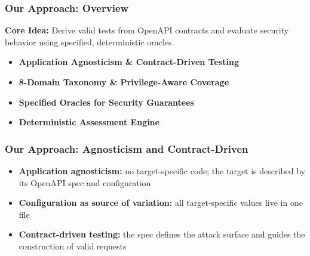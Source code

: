 \begin{frame}
    \frametitle{Our Approach: Overview}

    \textbf{Core Idea:} Derive \alert{valid tests} from OpenAPI contracts and evaluate \alert{security behavior} using specified, deterministic oracles.

    \vspace{1em}
    \begin{itemize}
        \setlength{\itemsep}{0.8em}
        \item \textbf{Application \alert{Agnosticism} \& \alert{Contract-Driven} Testing}

        \item \textbf{8-Domain \alert{Taxonomy} \& Privilege-Aware Coverage}

        \item \textbf{\alert{Specified Oracles} for Security Guarantees}

        \item \textbf{\alert{Deterministic} Assessment Engine}
    \end{itemize}

\end{frame}


\begin{frame}
    \frametitle{Our Approach: Agnosticism and Contract-Driven}
    \begin{itemize}
        \setlength{\itemsep}{0.8em}
        \item \textbf{Application agnosticism:} no target-specific code; the target is described by its \alert{OpenAPI spec} and configuration

        \item \textbf{Configuration as source of variation:} all target-specific values live in \alert{one file}

        \item \textbf{Contract-driven testing:} the spec defines the \alert{attack surface} and guides the construction of \alert{valid requests}
    \end{itemize}
\end{frame}

